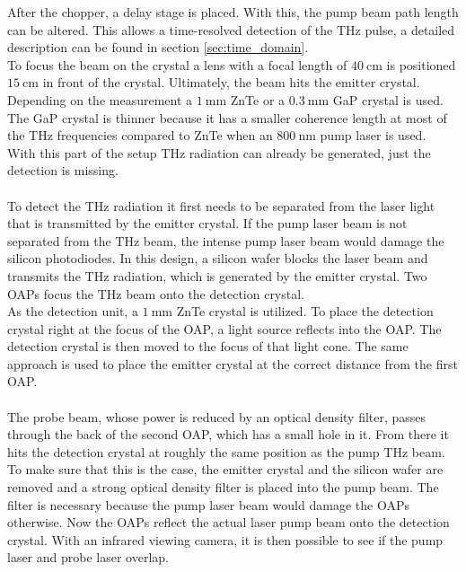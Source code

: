 After the chopper, a delay stage is placed.
With this, the pump beam path length can be altered.
This allows a time-resolved detection of the $\si{\tera\hertz}$ pulse, a detailed description can be found in section \ref{sec:time_domain}.
\\
To focus the beam on the crystal a lens with a focal length of $\SI{40}{\centi\meter}$ is positioned $\SI{15}{\centi\meter}$ in front of the crystal.
Ultimately, the beam hits the emitter crystal.
Depending on the measurement a $\SI{1}{\milli\meter}$ ZnTe or a $\SI{0.3}{\milli\meter}$ GaP crystal is used.
The GaP crystal is thinner because it has a smaller coherence length at most of the $\si{\tera\hertz}$ frequencies compared to ZnTe when an $\SI{800}{\nano\meter}$ pump laser is used.
\\
With this part of the setup $\si{\tera\hertz}$ radiation can already be generated, just the detection is missing.
\\\\
To detect the $\si{\tera\hertz}$ radiation it first needs to be separated from the laser light that is transmitted by the emitter crystal.
If the pump laser beam is not separated from the $\si{\tera\hertz}$ beam, the intense pump laser beam would damage the silicon photodiodes.
In this design, a silicon wafer blocks the laser beam and transmits the $\si{\tera\hertz}$ radiation, which is generated by the emitter crystal.
Two OAPs focus the $\si{\tera\hertz}$ beam onto the detection crystal.
\\
As the detection unit, a $\SI{1}{\milli\meter}$ ZnTe crystal is utilized.
To place the detection crystal right at the focus of the OAP, a light source reflects into the OAP.
The detection crystal is then moved to the focus of that light cone.
The same approach is used to place the emitter crystal at the correct distance from the first OAP.
\\\\
The probe beam, whose power is reduced by an optical density filter, passes through the back of the second OAP, which has a small hole in it.
From there it hits the detection crystal at roughly the same position as the pump $\si{\tera\hertz}$ beam.
\\
To make sure that this is the case, the emitter crystal and the silicon wafer are removed and a strong optical density filter is placed into the pump beam.
The filter is necessary because the pump laser beam would damage the OAPs otherwise.
Now the OAPs reflect the actual laser pump beam onto the detection crystal.
With an infrared viewing camera, it is then possible to see if the pump laser and probe laser overlap.
